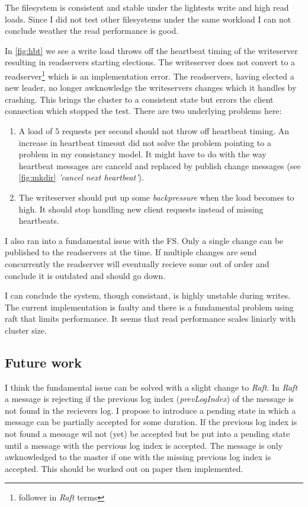The filesystem is consistent and stable under the lightests write and high read loads. Since I did not test other filesystems under the same workload I can not conclude weather the read performance is good. 

In \cref{fig:hbt} we see a write load throws off the heartbeat timing of the writeserver resulting in readservers starting elections. The writeserver does not convert to a readserver\footnote{follower in \textit{Raft} terms} which is an implementation error. The readservers, having elected a new leader, no longer awknowledge the writeservers changes which it handles by crashing. This brings the cluster to a consistent state but errors the client connection which stopped the test. 
There are two underlying problems here:

\begin{enumerate}
	\item A load of $5$ requests per second should not throw off heartbeat timing. An increase in heartbeat timeout did not solve the problem pointing to a problem in my consistancy model. It might have to do with the way heartbeat messages are canceld and replaced by publish change messages (see \cref{fig:mkdir} \textit{'cancel next heartbeat'}).
	\item The writeserver should put up some \textit{backpressure} when the load becomes to high. It should stop handling new client requests instead of missing heartbeats.
\end{enumerate}

I also ran into a fundamental issue with the FS. Only a single change can be published to the readservers at the time. If multiple changes are send concurrently the readserver will eventually recieve some out of order and conclude it is outdated and should go down. 

I can conclude the system, though consistant, is highly unstable during writes. The current implementation is faulty and there is a fundamental problem using raft that limits performance. It seems that read performance scales liniarly with cluster size. 

\subsection{Future work}
I think the fundamental issue can be solved with a slight change to \textit{Raft}. In \textit{Raft} a message is rejecting if the previous log index (\textit{prevLogIndex}) of the message is not found in the recievers log. I propose to introduce a pending state in which a message can be partially accepted for some duration. If the previous log index is not found a message wil not (yet) be accepted but be put into a pending state until a message with the pervious log index is accepted. The message is only awknowledged to the master if one with the missing previous log index is accepted. This should be worked out on paper then implemented.

